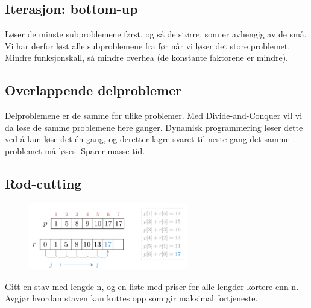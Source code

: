 \documentclass[12pt]{report}
\begin{document}
\vspace{\baselineskip}
\subsection*{Iterasjon: bottom-up}
Løser de minste subproblemene først, og så de større, som er avhengig av de små. Vi har derfor løst alle subproblemene fra før når vi løser det store problemet. Mindre funksjonskall, så mindre overhea (de konstante faktorene er mindre). \par


\vspace{\baselineskip}
\subsection*{Overlappende delproblemer}
Delproblemene er de samme for ulike problemer. Med Divide-and-Conquer vil vi da løse de samme problemene flere ganger. Dynamisk programmering løser dette ved å kun løse det én gang, og deretter lagre svaret til neste gang det samme problemet må løses. Sparer masse tid. \par

\setlength{\parskip}{6.0pt}

\vspace{\baselineskip}\subsection*{Rod-cutting}



\begin{figure}[H]
\advance\leftskip 4.38in		\includegraphics[width=2.73in,height=1.15in]{./media/image50.png}
\end{figure}



\setlength{\parskip}{10.56pt}
Gitt en stav med lengde n, og en liste med priser for alle lengder kortere enn n. Avgjør hvordan staven kan kuttes opp som gir maksimal fortjeneste.\par
\end{document}
